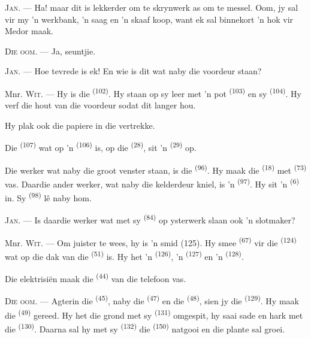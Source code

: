 \textsc{Jan}. --- Ha! maar dit is lekkerder om te skrynwerk as om te messel. Oom, jy sal
vir my 'n werkbank, 'n saag en 'n skaaf koop, want ek sal binnekort 'n hok vir Medor
maak.

\textsc{Die oom}. --- Ja, seuntjie.

\textsc{Jan}. --- Hoe tevrede is ek! En wie is dit wat naby die voordeur staan?

\VUsaut{3.0mm}
\VUsaut{3.0mm}

Mnr. \textsc{Wit}. --- Hy is die  \textsuperscript{(102)}. Hy staan op sy
leer met 'n pot  \textsuperscript{(103)} en sy 
\textsuperscript{(104)}. Hy verf die hout van die voordeur sodat dit langer hou.

Hy plak ook die papiere in die vertrekke.

Die  \textsuperscript{(107)} wat op 'n 
\textsuperscript{(106)} is, op die  \textsuperscript{(28)}, sit 'n
 \textsuperscript{(29)} op.

Die werker wat naby die groot venster staan, is die 
\textsuperscript{(96)}. Hy maak die  \textsuperscript{(18)} met
 \textsuperscript{(73)} vas. Daardie ander werker, wat naby die
kelderdeur kniel, is 'n  \textsuperscript{(97)}. Hy sit 'n
 \textsuperscript{(6)} in. Sy  \textsuperscript{(98)} lê naby
hom.

\textsc{Jan}. --- Is daardie werker wat met sy  \textsuperscript{(84)} op
ysterwerk slaan ook 'n slotmaker?

Mnr. \textsc{Wit}. --- Om juister te wees, hy is 'n smid (125). Hy smee
 \textsuperscript{(67)} vir die 
\textsuperscript{(124)} wat op die dak van die 
\textsuperscript{(51)} is. Hy het 'n  \textsuperscript{(126)}, 'n
 \textsuperscript{(127)} en 'n  \textsuperscript{(128)}.

Die elektrisiën maak die  \textsuperscript{(44)}  van die
telefoon vas.

\VUsaut{3.0mm}

\textsc{Die oom}. --- Agterin die  \textsuperscript{(45)}, naby die
 \textsuperscript{(47)} en die  \textsuperscript{(48)}, sien
jy die  \textsuperscript{(129)}. Hy maak die 
\textsuperscript{(49)} gereed. Hy het die grond met sy 
\textsuperscript{(131)} omgespit, hy saai sade en hark met die 
\textsuperscript{(130)}. Daarna sal hy met sy  \textsuperscript{(132)}
die  \textsuperscript{(150)} natgooi en die plante sal groei.

